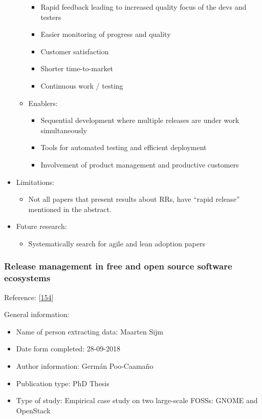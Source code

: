 \documentclass[]{book}
\providecommand{\tightlist}{%
  \setlength{\itemsep}{0pt}\setlength{\parskip}{0pt}}
\begin{document}
\begin{itemize}
\begin{itemize}
    \begin{itemize}
    \tightlist
    \item
      Rapid feedback leading to increased quality focus of the devs and
      testers
    \item
      Easier monitoring of progress and quality
    \item
      Customer satisfaction
    \item
      Shorter time-to-market
    \item
      Continuous work / testing
    \end{itemize}
  \item
    Enablers:

    \begin{itemize}
    \tightlist
    \item
      Sequential development where multiple releases are under work
      simultaneously
    \item
      Tools for automated testing and efficient deployment
    \item
      Involvement of product management and productive customers
    \end{itemize}
  \end{itemize}
\item
  Limitations:

  \begin{itemize}
  \tightlist
  \item
    Not all papers that present results about RRs, have ``rapid
    release'' mentioned in the abstract.
  \end{itemize}
\item
  Future research:

  \begin{itemize}
  \tightlist
  \item
    Systematically search for agile and lean adoption papers
  \end{itemize}
\end{itemize}

\subsubsection{Release management in free and open source software
ecosystems}\label{release-management-in-free-and-open-source-software-ecosystems}

Reference: {[}\protect\hyperlink{ref-poo-caamano2016a}{154}{]}

General information:

\begin{itemize}
\tightlist
\item
  Name of person extracting data: Maarten Sijm
\item
  Date form completed: 28-09-2018
\item
  Author information: Germán Poo-Caamaño
\item
  Publication type: PhD Thesis
\item
  Type of study: Empirical case study on two large-scale FOSSs: GNOME
  and OpenStack
\end{itemize}
\end{document}
